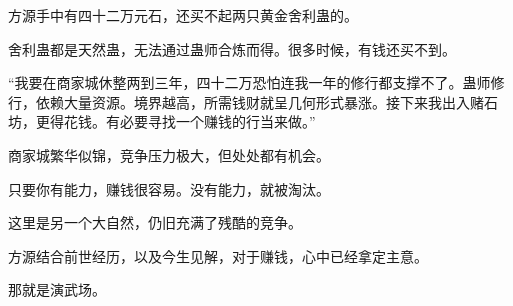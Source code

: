\begin{this_body}
方源手中有四十二万元石，还买不起两只黄金舍利蛊的。

舍利蛊都是天然蛊，无法通过蛊师合炼而得。很多时候，有钱还买不到。

“我要在商家城休整两到三年，四十二万恐怕连我一年的修行都支撑不了。蛊师修行，依赖大量资源。境界越高，所需钱财就呈几何形式暴涨。接下来我出入赌石坊，更得花钱。有必要寻找一个赚钱的行当来做。”

商家城繁华似锦，竞争压力极大，但处处都有机会。

只要你有能力，赚钱很容易。没有能力，就被淘汰。

这里是另一个大自然，仍旧充满了残酷的竞争。

方源结合前世经历，以及今生见解，对于赚钱，心中已经拿定主意。

那就是演武场。

\end{this_body}

